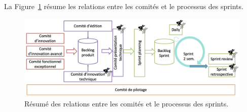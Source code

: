 La Figure~\ref{fig:committees-and-scrum} résume les relations entre les comités et le processus des sprints.

\begin{figure}[h]
    \centering
    \includegraphics[width=\textwidth]{img/committees-and-scrum}
    \caption{Résumé des relations entre les comités et le processus des sprints.}
    \label{fig:committees-and-scrum}
\end{figure}